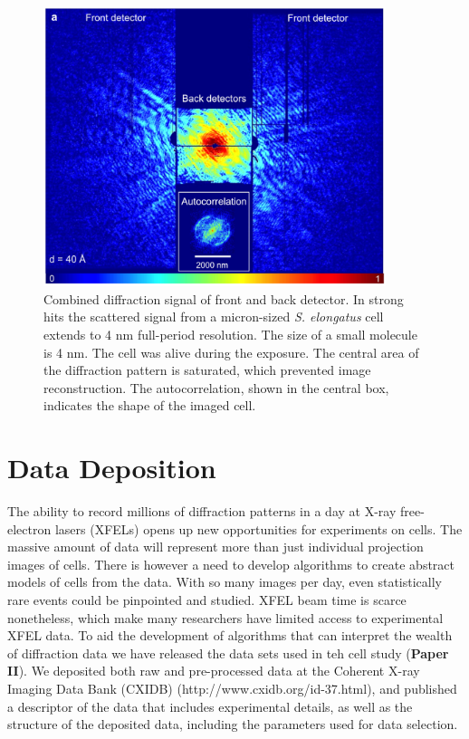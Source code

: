 \begin{figure}[!ht]
	\centering 
		\includegraphics[width=100mm]{StrongHit.png}
	\caption{Combined diffraction signal of front and back detector. In strong hits the scattered signal from a micron-sized \textit{S. elongatus} cell extends to 4 nm full-period resolution. The size of a small molecule is 4 nm. The cell was alive during the exposure. The central area of the diffraction pattern is saturated, which prevented image reconstruction. The autocorrelation, shown in the central box, indicates the shape of the imaged cell.}\label{fig:StrongHit}
\end{figure}

\section{Data Deposition}
The ability to record millions of diffraction patterns in a day at X-ray free-electron lasers (XFELs) opens up new opportunities for experiments on cells. The massive amount of data will represent more than just individual projection images of cells. There is however a need to develop algorithms to create abstract models of cells from the data. With so many images per day, even statistically rare events could be pinpointed and studied. XFEL beam time is scarce nonetheless, which make many researchers have limited access to experimental XFEL data. To aid the development of algorithms that can interpret the wealth of diffraction data we have released the data sets used in teh cell study (\textbf{Paper II}). We deposited both raw and pre-processed data at the Coherent X-ray Imaging Data Bank (CXIDB) \cite{Maia2012a} (http://www.cxidb.org/id-37.html), and published a descriptor of the data that includes experimental details, as well as the structure of the deposited data, including the parameters used for data selection.

